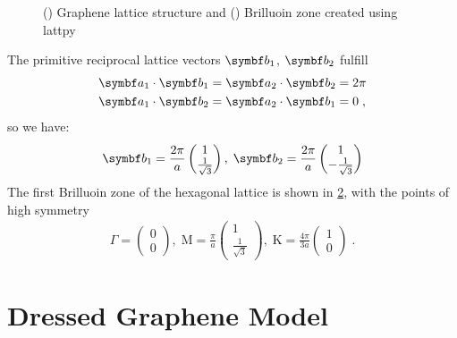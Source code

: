 \documentclass[../notes.tex]{subfiles}
\begin{document}
\begin{figure}[tb]
	\centering
	\begin{subfigure}[t]{0.5\textwidth}
		\centering
		\caption{\hfill\null}\label{sfig:graphene lattice structure}
		
	\end{subfigure}%
	\begin{subfigure}[t]{0.5\textwidth}
		\centering
		\caption{\hfill\null}\label{sfig:graphene Brillouin zone}
		
	\end{subfigure}
	\caption{() Graphene lattice structure and () Brilluoin zone created using lattpy \cite{Jones_lattpy_2022}}
	\label{fig:Graphene lattice structure and Brilluoin zone}
\end{figure}
The primitive reciprocal lattice vectors \(\vb{b}_1\), \(\vb{b}_2\) fulfill
\begin{align}
	\vb{a}_1 \cdot \vb{b}_1 &= \vb{a}_2 \cdot \vb{b}_2 = 2\pi \\
	\vb{a}_1 \cdot \vb{b}_2 &= \vb{a}_2 \cdot \vb{b}_1 = 0\;,
\end{align}
so we have:
\begin{align}
	\vb{b}_1 = \frac{2\pi}{a} \begin{pmatrix} 1 \\ \frac{1}{\sqrt{3}} \end{pmatrix},\;
	\vb{b}_2 = \frac{2\pi}{a} \begin{pmatrix} 1 \\ - \frac{1}{\sqrt{3}} \end{pmatrix}
\end{align}
The first Brilluoin zone of the hexagonal lattice is shown in \cref{sfig:graphene Brillouin zone}, with the points of high symmetry
\begin{align}
	\Gamma = \begin{pmatrix} 0 \\ 0 \end{pmatrix},\;
	\mathrm{M} = \frac{\pi}{a} \begin{pmatrix} 1 \\ \frac{1}{\sqrt{3}} \end{pmatrix},\;
	\mathrm{K} = \frac{4\pi}{3 a} \begin{pmatrix} 1 \\ 0 \end{pmatrix}\;.
\end{align}


\section{Dressed Graphene Model}\label{sec:dressed graphene model}
\end{document}

